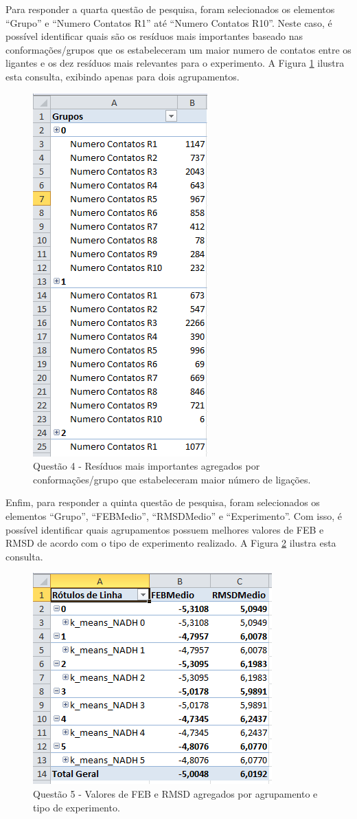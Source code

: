 Para responder a quarta questão de pesquisa, foram selecionados os elementos ``Grupo'' e ``Numero Contatos R1'' até ``Numero Contatos R10''. Neste caso, é possível identificar quais são os resíduos mais importantes baseado nas conformações/grupos que os estabeleceram um maior numero de contatos entre os ligantes e os dez resíduos mais relevantes para o experimento. A Figura \ref{fig:questao4} ilustra esta consulta, exibindo apenas para dois agrupamentos. 

\begin{figure}[h]
        \center
        \includegraphics[scale=0.7]{images/Questao4.PNG}
        \caption{Questão 4 - Resíduos mais importantes agregados por conformações/grupo que estabeleceram maior número de ligações.}
        \label{fig:questao4}
\end{figure}

Enfim, para responder a quinta questão de pesquisa, foram selecionados os elementos ``Grupo'', ``FEBMedio'', ``RMSDMedio'' e ``Experimento''. Com isso, é possível identificar quais agrupamentos possuem melhores valores de FEB e RMSD de acordo com o tipo de experimento realizado. A Figura \ref{fig:questao5} ilustra esta consulta.

\begin{figure}[h]
        \center
        \includegraphics[scale=0.8]{images/Questao5.PNG}
        \caption{Questão 5 - Valores de FEB e RMSD agregados por agrupamento e tipo de experimento.}
        \label{fig:questao5}
\end{figure}

